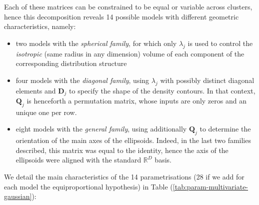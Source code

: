 Each of these matrices can be constrained to be equal or variable across clusters, hence this decomposition reveals 14 possible models with different geometric characteristics, namely:

\begin{itemize}
\item
  two models with the \emph{spherical family}, for which only \(\lambda_j\) is used to control the \emph{isotropic} (same radius in any dimension) volume of each component of the corresponding distribution structure
\item
  four models with the \emph{diagonal family}, using \(\lambda_j\) with possibly distinct diagonal elements and \(\boldsymbol{D}_j\) to specify the shape of the density contours. In that context, \(\boldsymbol{Q}_j\) is henceforth a permutation matrix, whose inputs are only zeros and an unique one per row.
\item
  eight models with the \emph{general family}, using additionally \(\boldsymbol{Q}_j\) to determine the orientation of the main axes of the ellipsoids. Indeed, in the last two families described, this matrix was equal to the identity, hence the axis of the ellipsoids were aligned with the standard \(\mathbb{R}^D\) basis.
\end{itemize}

We detail the main characteristics of the 14 parametrisations (28 if we add for each model the equiproportional hypothesis) in Table (\ref{tab:param-multivariate-gaussian}):

